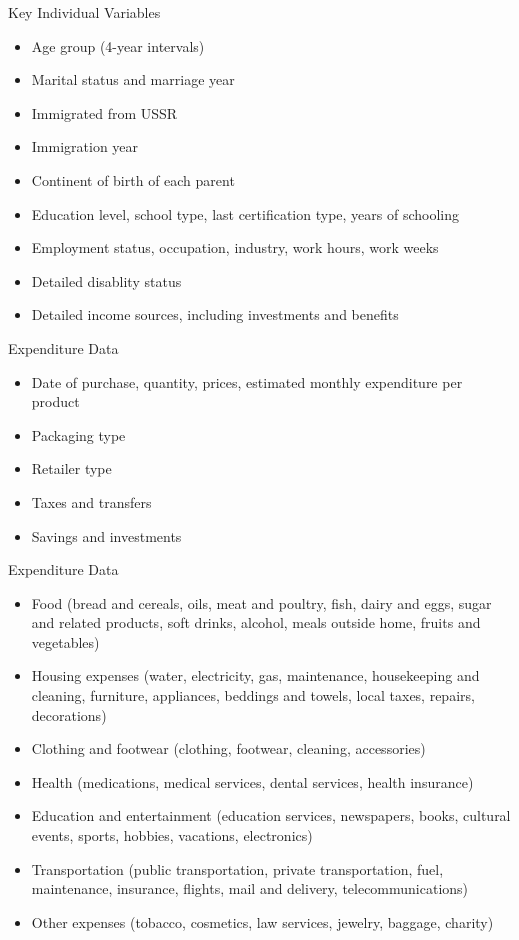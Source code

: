 \documentclass{beamer}
\begin{document}
\begin{frame}{Key Individual Variables}
    \begin{itemize}
        \item Age group (4-year intervals)
        \item Marital status and marriage year
        \item Immigrated from USSR
        \item Immigration year
        \item Continent of birth of each parent
        \item Education level, school type, last certification type, years of schooling
        \item Employment status, occupation, industry, work hours, work weeks
        \item Detailed disablity status
        \item Detailed income sources, including investments and benefits
    \end{itemize}
\end{frame}

\begin{frame}{Expenditure Data}
    \begin{itemize}
        \item Date of purchase, quantity, prices, estimated monthly expenditure per product
        \item Packaging type
        \item Retailer type
        \item Taxes and transfers
        \item Savings and investments
    \end{itemize}
\end{frame}

\begin{frame}{Expenditure Data}
    \begin{itemize}
        \item Food (bread and cereals, oils, meat and poultry, fish, dairy and eggs, sugar and related products, soft drinks, alcohol, meals outside home, fruits and vegetables)
        \item Housing expenses (water, electricity, gas, maintenance, housekeeping and cleaning, furniture, appliances, beddings and towels, local taxes, repairs, decorations)
        \item Clothing and footwear (clothing, footwear, cleaning, accessories)
        \item Health (medications, medical services, dental services, health insurance)
        \item Education and entertainment (education services, newspapers, books, cultural events, sports, hobbies, vacations, electronics)
        \item Transportation (public transportation, private transportation, fuel, maintenance, insurance, flights, mail and delivery, telecommunications)
        \item Other expenses (tobacco, cosmetics, law services, jewelry, baggage, charity)
    \end{itemize}
\end{frame}
\end{document}
